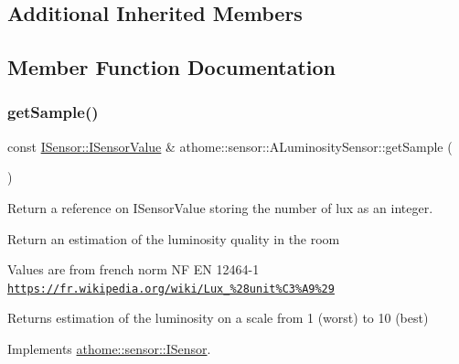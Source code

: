 \subsection*{Additional Inherited Members}


\subsection{Member Function Documentation}
\mbox{\label{classathome_1_1sensor_1_1_a_luminosity_sensor_a6e0e7bcfe13cd8d8edf6a09f6e230ef8}} 
\subsubsection{\texorpdfstring{get\+Sample()}{getSample()}}
{\footnotesize\ttfamily const \mbox{\hyperlink{structathome_1_1sensor_1_1_i_sensor_1_1_i_sensor_value}{I\+Sensor\+::\+I\+Sensor\+Value}} \& athome\+::sensor\+::\+A\+Luminosity\+Sensor\+::get\+Sample (\begin{DoxyParamCaption}{ }\end{DoxyParamCaption})\hspace{0.3cm}{\ttfamily [virtual]}}

Return a reference on I\+Sensor\+Value storing the number of lux as an integer.

Return an estimation of the luminosity quality in the room

Values are from french norm NF EN 12464-\/1 \href{https://fr.wikipedia.org/wiki/Lux_%28unit%C3%A9%29}{\tt https\+://fr.\+wikipedia.\+org/wiki/\+Lux\+\_\+\%28unit\%\+C3\%\+A9\%29} \begin{DoxyReturn}{Returns}
estimation of the luminosity on a scale from 1 (worst) to 10 (best) 
\end{DoxyReturn}


Implements \mbox{\hyperlink{classathome_1_1sensor_1_1_i_sensor_ae109cd3741ea9c88dc7e4f2eaf1485d5}{athome\+::sensor\+::\+I\+Sensor}}.

\mbox{\label{classathome_1_1sensor_1_1_a_luminosity_sensor_ae756f7d7647c2cf695305c8f11aec8d3}} 
